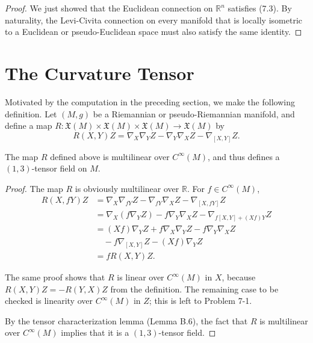 \begin{proof}
We just showed that the Euclidean connection on $\mathbb{R}^n$ satisfies (7.3). By naturality, the Levi-Civita connection on every manifold that is locally isometric to a Euclidean or pseudo-Euclidean space must also satisfy the same identity.
\end{proof}

\section{The Curvature Tensor}

Motivated by the computation in the preceding section, we make the following definition. Let $(M, g)$ be a Riemannian or pseudo-Riemannian manifold, and define a map $R: \mathfrak{X}(M) \times \mathfrak{X}(M) \times \mathfrak{X}(M) \to \mathfrak{X}(M)$ by
$$R(X,Y)Z = \nabla_X \nabla_Y Z - \nabla_Y \nabla_X Z - \nabla_{[X,Y]}Z.$$

\begin{proposition}
\label{prop:curvature-multilinearity}
The map $R$ defined above is multilinear over $C^\infty(M)$, and thus defines a $(1,3)$-tensor field on $M$.
\end{proposition}

\begin{proof}
The map $R$ is obviously multilinear over $\mathbb{R}$. For $f \in C^\infty(M)$,
\begin{align*}
R(X, fY)Z &= \nabla_X \nabla_{fY} Z - \nabla_{fY} \nabla_X Z - \nabla_{[X,fY]}Z\\
&= \nabla_X (f \nabla_Y Z) - f \nabla_Y \nabla_X Z - \nabla_{f[X,Y]+(Xf)Y}Z\\
&= (Xf)\nabla_Y Z + f\nabla_X \nabla_Y Z - f\nabla_Y \nabla_X Z\\
&\quad - f\nabla_{[X,Y]}Z - (Xf)\nabla_Y Z\\
&= fR(X,Y)Z.
\end{align*}

The same proof shows that $R$ is linear over $C^\infty(M)$ in $X$, because $R(X,Y)Z = -R(Y,X)Z$ from the definition. The remaining case to be checked is linearity over $C^\infty(M)$ in $Z$; this is left to Problem 7-1.

By the tensor characterization lemma (Lemma B.6), the fact that $R$ is multilinear over $C^\infty(M)$ implies that it is a $(1,3)$-tensor field.
\end{proof}

